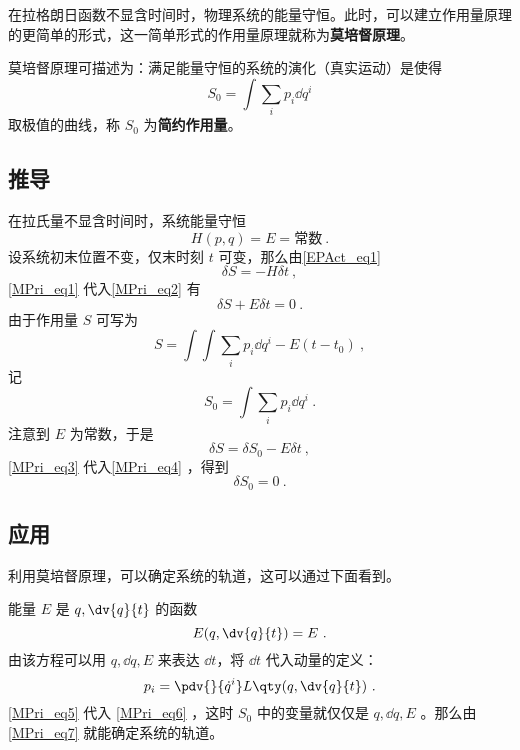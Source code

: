 在拉格朗日函数不显含时间时，物理系统的能量守恒。此时，可以建立作用量原理的更简单的形式，这一简单形式的作用量原理就称为\textbf{莫培督原理}。

莫培督原理可描述为：满足能量守恒的系统的演化（真实运动）是使得
\begin{equation}
S_0=\int\sum_i p_i\dd q^i
\end{equation}
取极值的曲线，称 $S_0$ 为\textbf{简约作用量}。
\subsection{推导}
在拉氏量不显含时间时，系统能量守恒
\begin{equation}\label{MPri_eq1}
H(p,q)=E=\text{常数}~.
\end{equation}
设系统初末位置不变，仅末时刻 $t$ 可变，那么由\autoref{EPAct_eq1}~
\begin{equation}\label{MPri_eq2}
\delta S=-H\delta t~,
\end{equation}
\autoref{MPri_eq1} 代入\autoref{MPri_eq2} 有
\begin{equation}\label{MPri_eq4}
\delta S+E\delta t=0~.
\end{equation}
由于作用量 $S$ 可写为
\begin{equation}
S=\int \int\sum_i p_i\dd q^i-E(t-t_0)~,
\end{equation}
记
\begin{equation}\label{MPri_eq6}
S_0=\int\sum_i p_i\dd q^i~.
\end{equation}
注意到 $E$ 为常数，于是
\begin{equation}\label{MPri_eq3}
\delta S=\delta S_0-E\delta t~,
\end{equation}
\autoref{MPri_eq3} 代入\autoref{MPri_eq4} ，得到
\begin{equation}\label{MPri_eq7}
\delta S_0=0~.
\end{equation}
\subsection{应用}
利用莫培督原理，可以确定系统的轨道，这可以通过下面看到。

能量 $E$ 是 $q,\dv{q}{t}$ 的函数 
\begin{equation}
E(q,\dv{q}{t})=E~.
\end{equation}
由该方程可以用 $q,\dd q,E$ 来表达 $\dd t$，将 $\dd t$ 代入动量的定义：
\begin{equation}\label{MPri_eq5}
p_i=\pdv{}{\dot q^i}L\qty(q,\dv{q}{t})~.
\end{equation}
\autoref{MPri_eq5} 代入 \autoref{MPri_eq6} ，这时 $S_0$ 中的变量就仅仅是 $q,\dd q, E$ 。那么由\autoref{MPri_eq7} 就能确定系统的轨道。